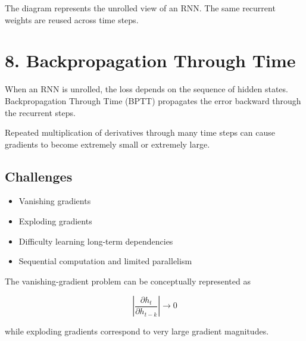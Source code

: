 \documentclass[10pt]{article}
\begin{document}
The diagram represents the unrolled view of an RNN. The same recurrent weights
are reused across time steps.

\section*{8. Backpropagation Through Time}

When an RNN is unrolled, the loss depends on the sequence of hidden states.
Backpropagation Through Time (BPTT) propagates the error backward through
the recurrent steps.

\begin{center}
\end{center}

Repeated multiplication of derivatives through many time steps can cause
gradients to become extremely small or extremely large.

\subsection*{Challenges}

\begin{itemize}
\item Vanishing gradients
\item Exploding gradients
\item Difficulty learning long-term dependencies
\item Sequential computation and limited parallelism
\end{itemize}

The vanishing-gradient problem can be conceptually represented as

\[
\left|\frac{\partial h_t}{\partial h_{t-k}}\right|\rightarrow0
\]

while exploding gradients correspond to very large gradient magnitudes.
\end{document}
